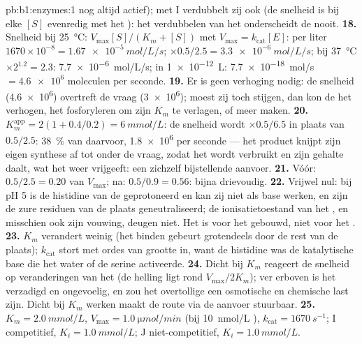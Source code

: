 \begin{solution}{pb:b1:enzymes:1}
nog altijd actief); met I verdubbelt zij ook (de snelheid is bij elke $[S]$
evenredig met het ): het verdubbelen van het  onderscheidt de 
nooit.
\textbf{18.} Snelheid bij \qty{25}{\celsius}: $V_{\max}[S]/(K_m + [S])$ met
$V_{\max} = k_{\text{cat}}[E]$: per liter $1670\times 10^{-8} =
\qty{1.67e-5}{mol/L/s}$; $\times 0.5/2.5 = \qty{3.3e-6}{mol/L/s}$; bij
\qty{37}{\celsius} $\times 2^{1.2} = 2.3$: \qty{7.7e-6}{mol/L/s}; in
\qty{1e-12}{L}: \qty{7.7e-18}{mol/s} $= \num{4.6e6}$ moleculen per seconde.
\textbf{19.} Er is geen verhoging nodig: de snelheid (\num{4.6e6}) overtreft de
vraag (\num{3e6}); moest zij toch stijgen, dan kon de  het  verhogen,
het  fosforyleren om zijn $K_m$ te verlagen, of meer  maken.
\textbf{20.} $K_m^{\text{app}} = 2(1 + 0.4/0.2) = \qty{6}{mmol/L}$: de snelheid
wordt $\times 0.5/6.5$ in plaats van $0.5/2.5$: \qty{38}{\%} van daarvoor,
\num{1.8e6} per seconde --- het product knijpt zijn eigen synthese af tot onder de
vraag, zodat het wordt verbruikt en zijn gehalte daalt, wat het  weer
vrijgeeft: een zichzelf bijstellende aanvoer.
\textbf{21.} Vóór: $0.5/2.5 = 0.20$ van $V_{\max}$; na: $0.5/0.9 =
0.56$: bijna drievoudig.
\textbf{22.} Vrijwel nul: bij pH 5 is de histidine van de 
geprotoneerd en kan zij niet als base werken, en zijn de zure residuen van de
plaats geneutraliseerd; de ionisatietoestand van het , en misschien ook zijn
vouwing, deugen niet. Het is voor het  gebouwd, niet voor het .
\textbf{23.} $K_m$ verandert weinig (het binden gebeurt grotendeels door de rest
van de plaats); $k_{\text{cat}}$ stort met ordes van grootte in, want de histidine
was de katalytische base die het water of de serine activeerde.
\textbf{24.} Dicht bij $K_m$ reageert de snelheid op veranderingen van het
 (de helling ligt rond $V_{\max}/2K_m$); ver erboven is het 
verzadigd en ongevoelig, en zou het overtollige  een osmotische en
chemische last zijn. Dicht bij $K_m$ werken maakt de route via de aanvoer
stuurbaar.
\textbf{25.} $K_m = \qty{2.0}{mmol/L}$, $V_{\max} = \qty{1.0}{\micro mol/min}$
(bij \qty{10}{nmol/L} ), $k_{\text{cat}} = \qty{1670}{s^{-1}}$; I
competitief, $K_i = \qty{1.0}{mmol/L}$; J niet-competitief, $K_i =
\qty{1.0}{mmol/L}$.
\end{solution}
